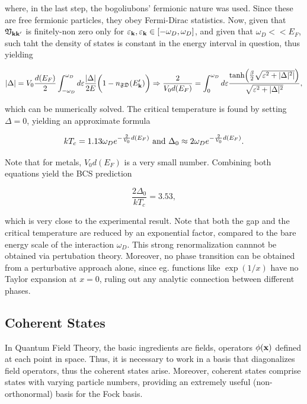 where, in the last step, the bogoliubons' fermionic nature was used. Since these are free fermionic particles, they obey Fermi-Dirac statistics. Now, given that $\mathfrak{V}_{{\bf k}{\bf k}'}$ is finitely-non zero only for $\varepsilon_{{\bf k}}, \varepsilon_{{\bf k}} \in [-\omega_D, \omega_D]$, and given that $\omega_D << E_F$, such taht the density of states is constant in the energy interval in question, thus yielding

\begin{equation}
    |\Delta| = V_0 \frac{d(E_F)}{2} \int_{-\omega_D}^{\omega_D} d \varepsilon \frac{|\Delta|}{2E} \bigg(1 - n_{\mathfrak{F}\mathfrak{D}}(E_{\bf k}') \bigg) \Rightarrow \frac{2}{V_0 d(E_F)} = \int_{0}^{\omega_D} d\varepsilon \frac{\tanh(\frac{\beta}{2} \sqrt{\varepsilon^2+|\Delta|^2|})}{\sqrt{\varepsilon^2 + |\Delta|^2}},
\end{equation}

which can be numerically solved. The critical temperature is found by setting $\Delta = 0$, yielding an approximate formula

$$
    k T_c = 1.13 \omega_D e^{-\frac{2}{V_0} d(E_F)} \textnormal{ and } \Delta_0 \approx 2 \omega_D e^{-\frac{2}{V_0} d(E_F)}.
$$

Note that for metals, $V_0 d(E_F)$ is a very small number. Combining both equations yield the BCS prediction 

$$
\frac{2\Delta_0}{kT_c} = 3.53,
$$

which is very close to the experimental result. Note that both the gap and the critical temperature are reduced by an exponential factor, compared to the bare energy scale of the interaction $\omega_D$. This strong renormalization cannnot be obtained via pertubation theory. Moreover, no phase transition can be obtained from a perturbative approach alone, since eg. functions like $\exp(1/x)$ have no Taylor expansion at $x=0$, ruling out any analytic connection between different phases. 

\clearpage

\subsection{Coherent States}

In Quantum Field Theory, the basic ingredients are fields, operators $\phi({\bf x})$ defined at each point in space. Thus, it is necessary to work in a basis that diagonalizes field operators, thus the coherent states arise. Moreover, coherent states comprise states with varying particle numbers, providing an extremely useful (non-orthonormal) basis for the Fock basis. \\

